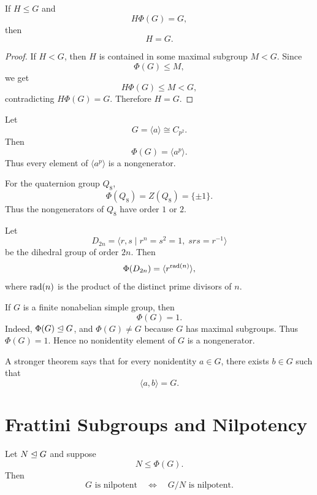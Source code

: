\begin{corollary}
If \(H\leq G\) and
\[
    H\Phi(G)=G,
\]
then
\[
    H=G.
\]
\end{corollary}

\begin{proof}
If \(H<G\), then \(H\) is contained in some maximal subgroup \(M<G\). Since
\[
    \Phi(G)\leq M,
\]
we get
\[
    H\Phi(G)\leq M<G,
\]
contradicting \(H\Phi(G)=G\). Therefore \(H=G\).
\end{proof}

\begin{example}
Let
\[
    G=\langle a\rangle\cong C_{p^2}.
\]
Then
\[
    \Phi(G)=\langle a^p\rangle.
\]
Thus every element of \(\langle a^p\rangle\) is a nongenerator.
\end{example}

\begin{example}
For the quaternion group \(Q_8\),
\[
    \Phi(Q_8)=Z(Q_8)=\{\pm 1\}.
\]
Thus the nongenerators of \(Q_8\) have order \(1\) or \(2\).
\end{example}

\begin{example}
Let
\[
    D_{2n}=\langle r,s\mid r^n=s^2=1,\; srs=r^{-1}\rangle
\]
be the dihedral group of order \(2n\). Then
\[
    \Phi(D_{2n})=\langle r^{\operatorname{rad}(n)}\rangle,
\]
where \(\operatorname{rad}(n)\) is the product of the distinct prime divisors of \(n\).
\end{example}

\begin{example}
If \(G\) is a finite nonabelian simple group, then
\[
    \Phi(G)=1.
\]
Indeed, \(\Phi(G)\trianglelefteq G\), and \(\Phi(G)\neq G\) because \(G\) has maximal
subgroups. Thus \(\Phi(G)=1\). Hence no nonidentity element of \(G\) is a
nongenerator.

A stronger theorem says that for every nonidentity \(a\in G\), there exists
\(b\in G\) such that
\[
    \langle a,b\rangle=G.
\]
\end{example}

\section{Frattini Subgroups and Nilpotency}

\begin{theorem}
Let \(N\trianglelefteq G\) and suppose
\[
    N\leq \Phi(G).
\]
Then
\[
    G\text{ is nilpotent}
    \quad\Longleftrightarrow\quad
    G/N\text{ is nilpotent}.
\]
\end{theorem}

